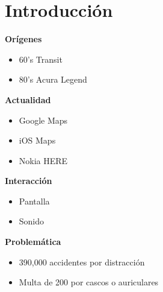 \section{Introducción}

\begin{slide}
  \begin{block}{\textbf{Orígenes}}
    \begin{itemize}
      \item 60's Transit
      \item 80's Acura Legend
    \end{itemize}
  \end{block}
  \begin{block}{\textbf{Actualidad}}
    \begin{itemize}
      \item Google Maps
      \item iOS Maps
      \item Nokia HERE
    \end{itemize}
  \end{block}
\end{slide}

\begin{slide}
  \begin{block}{\textbf{Interacción}}
    \begin{itemize}
      \item Pantalla
      \item Sonido
    \end{itemize}
  \end{block}
  \begin{block}{\textbf{Problemática}}
    \begin{itemize}
      \item 390,000 accidentes por distracción
      \item Multa de 200\EUR{} por cascos o auriculares
    \end{itemize}
  \end{block}
\end{slide}


